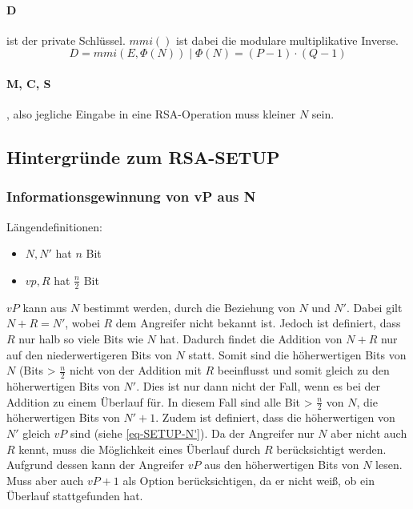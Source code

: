             \paragraph{D} ist der private Schlüssel. $mmi()$ ist dabei die modulare multiplikative Inverse.
            \begin{equation}
                D = mmi(E, \Phi(N)) \mid \Phi(N) = (P-1)\cdot(Q-1)
            \end{equation}

            \paragraph{M, C, S}, also jegliche Eingabe in eine \ac{RSA}-Operation muss kleiner $N$ sein.

        \subsection{Hintergründe zum RSA-SETUP}
            \subsubsection{Informationsgewinnung von vP aus N} \label{sec-SETUP-vP_from_N}
            Längendefinitionen:
            \begin{itemize}
                \item $N, N'$ hat $n$ Bit
                \item $vp, R$ hat $\frac{n}{2}$ Bit
            \end{itemize}
            $vP$ kann aus $N$ bestimmt werden, durch die Beziehung von $N$ und $N'$. Dabei gilt $N + R = N'$, wobei $R$ dem Angreifer nicht bekannt ist. Jedoch ist definiert, dass $R$ nur halb so viele Bits wie $N$ hat. Dadurch findet die Addition von $N + R$ nur auf den niederwertigeren Bits von $N$ statt. Somit sind die höherwertigen Bits von $N$ (Bits > $\frac{n}{2}$ nicht von der Addition mit $R$ beeinflusst und somit gleich zu den höherwertigen Bits von $N'$. Dies ist nur dann nicht der Fall, wenn es bei der Addition zu einem Überlauf für. In diesem Fall sind alle Bit > $\frac{n}{2}$ von $N$, die höherwertigen Bits von $N' + 1$.
            Zudem ist definiert, dass die höherwertigen von $N'$ gleich $vP$ sind (siehe \ref{eq-SETUP-N'}).
            Da der Angreifer nur $N$ aber nicht auch $R$ kennt, muss die Möglichkeit eines Überlauf durch $R$ berücksichtigt werden. 
            Aufgrund dessen kann der Angreifer $vP$ aus den höherwertigen Bits von $N$ lesen. Muss aber auch $vP + 1$ als Option berücksichtigen, da er nicht weiß, ob ein Überlauf stattgefunden hat.               
 
